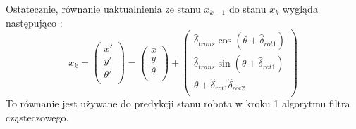 Ostatecznie, równanie uaktualnienia ze stanu $x_{k-1}$ do stanu $x_{k}$ wygląda następująco \cite{probabilistic_robotics}:
\begin{equation}
\label{eq:particle_update}
x_{k} = \left( \begin{array}{c} 
x' \\
y' \\
\theta' \\
\end{array} \right) = \left( \begin{array}{c} 
x \\
y \\
\theta \\
\end{array} \right) + \left( \begin{array}{c} 
\hat \delta_{trans} \cos (\theta + \hat \delta_{rot1}) \\
\hat \delta_{trans} \sin (\theta + \hat \delta_{rot1}) \\
\theta + \hat \delta_{rot1} \hat \delta_{rot2} \\
\end{array} \right)
\end{equation}
To równanie jest używane do predykcji stanu robota w kroku 1 algorytmu filtra cząsteczowego. 

